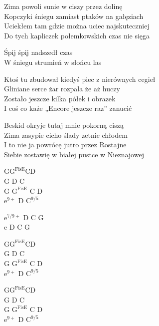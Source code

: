 \begin{text}
    Zima powoli sunie w ciszy przez dolinę\\
    Kopczyki śniegu zamiast ptaków na gałęziach\\
    Uciekłem tam gdzie można uciec najskuteczniej\\
    Do tych kapliczek połemkowskich czas nie sięga

    Śpij śpij nadszedł czas\\
    W śniegu strumień w słońcu las

    Ktoś tu zbudował kiedyś piec z nierównych cegieł\\
    Gliniane serce żar rozpala że aż huczy\\
    Zostało jeszcze kilka półek i obrazek\\
    I coś co każe „Encore jeszcze raz” zanucić

    Beskid okryje tutaj mnie pokorną ciszą\\
    Zima zasypie cicho ślady zetnie chłodem\\
    I to nie ja powrócę jutro przez Rostajne\\
    Siebie zostawię w białej pustce w Nieznajowej
\end{text}
\begin{chord}
    G$\mathrm{G^{Fis E}}$CD\\
    G D C\\
    G $\mathrm{G^{Fis E}}$ C D\\
    $\mathrm{e^{9+}}$ D $\mathrm{C^{9/5}}$

    $\mathrm{e^{7/9+}}$ D C G\\
    e D C G

    G$\mathrm{G^{Fis E}}$CD\\
    G D C\\
    G $\mathrm{G^{Fis E}}$ C D\\
    $\mathrm{e^{9+}}$ D $\mathrm{C^{9/5}}$

    G$\mathrm{G^{Fis E}}$CD\\
    G D C\\
    G $\mathrm{G^{Fis E}}$ C D\\
    $\mathrm{e^{9+}}$ D $\mathrm{C^{9/5}}$
\end{chord}
